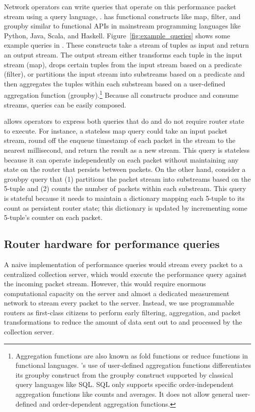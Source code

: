 Network operators can write queries that operate on this performance packet
stream using a query language, \TheSystem. \TheSystem has functional constructs
like {\ct map}, {\ct filter}, and {\ct groupby} similar to functional APIs in
mainstream programming languages like Python, Java, Scala, and Haskell.
Figure~\ref{fig:example_queries} shows some example queries in \TheSystem.
These constructs take a stream of tuples as input and return an output stream.
The output stream either transforms each tuple in the input stream ({\ct map}),
drops certain tuples from the input stream based on a predicate ({\ct filter}),
or partitions the input stream into substreams based on a predicate and then
aggregates the tuples within each substream based on a user-defined aggregation
function ({\ct groupby}).\footnote{Aggregation functions are also known as fold
functions or reduce functions in functional languages.  \TheSystem's use of
user-defined aggregation functions differentiates its groupby construct from
the groupby construct supported by classical query languages like SQL. SQL only
supports specific order-independent aggregation functions like counts and
averages. It does not allow general user-defined and order-dependent
aggregation functions.} Because all constructs produce and consume streams,
\TheSystem queries can be easily composed.

\TheSystem allows operators to express both queries that do and do not require
router state to execute. For instance, a stateless {\ct map} query could take
an input packet stream, round off the enqueue timestamp of each packet in the
stream to the nearest millisecond, and return the result as a new stream.  This
query is stateless because it can operate independently on each packet without
maintaining any state on the router that persists between packets. On the other
hand, consider a {\ct groubpy} query that (1) partitions the packet stream into
substreams based on the 5-tuple and (2) counts the number of packets within
each substream. This query is stateful because it needs to maintain a
dictionary mapping each 5-tuple to its count as persistent router state; this
dictionary is updated by incrementing some 5-tuple's counter on each packet.

\subsection{Router hardware for performance queries}
\label{ss:intro_pq_hardware}

A naive implementation of performance queries would stream every packet to a
centralized collection server, which would execute the performance query
against the incoming packet stream. However, this would require enormous
computational capacity on the server and almost a dedicated measurement network
to stream every packet to the server. Instead, we use programmable routers as
first-class citizens to perform early filtering, aggregation, and packet
transformations to reduce the amount of data sent out to and processed by the
collection server.

